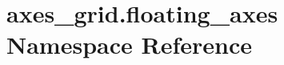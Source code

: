 \hypertarget{namespaceaxes__grid_1_1floating__axes}{}\section{axes\+\_\+grid.\+floating\+\_\+axes Namespace Reference}
\label{namespaceaxes__grid_1_1floating__axes}
